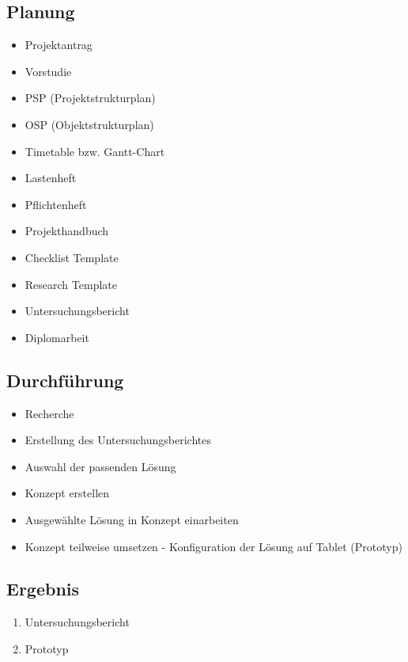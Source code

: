 \subsection{Planung}
\begin{itemize}
	\item Projektantrag
	\item Vorstudie
	\item PSP (Projektstrukturplan)
	\item OSP (Objektstrukturplan)
	\item Timetable bzw. Gantt-Chart
	\item Lastenheft
	\item Pflichtenheft
	\item Projekthandbuch
	\item Checklist Template
	\item Research Template
	\item Untersuchungsbericht
	\item Diplomarbeit
\end{itemize}
\subsection{Durchführung}
\begin{itemize}
	\item Recherche
	\item Erstellung des Untersuchungsberichtes
	\item Auswahl der passenden Lösung
	\item Konzept erstellen
	\item Ausgewählte Lösung in Konzept einarbeiten
	\item Konzept teilweise umsetzen - Konfiguration der Lösung auf Tablet (Prototyp)
\end{itemize}
\subsection{Ergebnis}
\begin{enumerate}
	\item Untersuchungsbericht
	\item Prototyp
\end{enumerate}

